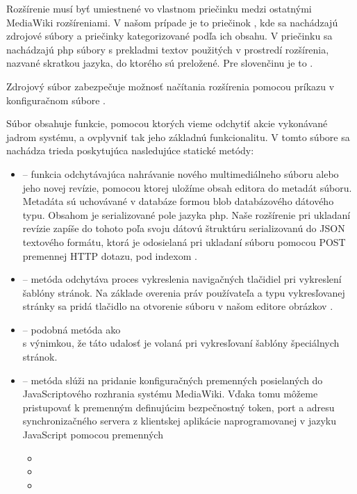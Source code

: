 Rozšírenie musí byť umiestnené vo vlastnom priečinku medzi ostatnými MediaWiki rozšíreniami. V našom prípade je to priečinok , kde sa nachádzajú zdrojové súbory a priečinky kategorizované podľa ich obsahu. V priečinku  sa nachádzajú php súbory s prekladmi textov použitých v prostredí rozšírenia, nazvané skratkou jazyka, do ktorého sú preložené. Pre slovenčinu je to .

Zdrojový súbor  zabezpečuje možnosť načítania rozšírenia pomocou príkazu  v konfiguračnom súbore .

Súbor  obsahuje funkcie, pomocou ktorých vieme odchytiť akcie vykonávané jadrom systému, a ovplyvniť tak jeho základnú funkcionalitu. V tomto súbore sa nachádza trieda  poskytujúca nasledujúce statické metódy:

\begin{itemize}
	\item {} -- funkcia odchytávajúca nahrávanie nového multimediálneho súboru alebo jeho novej revízie, pomocou ktorej uložíme obsah editora do metadát súboru. Metadáta sú uchovávané v databáze formou blob databázového dátového typu. Obsahom je serializované pole jazyka php. Naše rozšírenie pri ukladaní revízie zapíše do tohoto poľa svoju dátovú štruktúru serializovanú do JSON textového formátu, ktorá je odosielaná pri ukladaní súboru pomocou POST premennej HTTP dotazu, pod indexom .
	
	\item {} -- metóda odchytáva proces vykreslenia navigačných tlačidiel pri vykreslení šablóny stránok. Na základe overenia práv používateľa a typu vykresľovanej stránky sa pridá tlačidlo na otvorenie súboru v našom editore obrázkov .
	
	\item {} -- podobná metóda ako \\
	 s výnimkou, že táto udalosť je volaná pri vykresľovaní šablóny špeciálnych stránok.
	
	\item {} -- metóda slúži na pridanie konfiguračných premenných posielaných do JavaScriptového rozhrania systému MediaWiki. Vďaka tomu môžeme pristupovať k premenným definujúcim bezpečnostný token, port a adresu synchronizačného servera z klientskej aplikácie naprogramovanej v jazyku JavaScript pomocou premenných 
	\begin{itemize}
		\item {}
		\item {}
		\item {}
	\end{itemize}
\end{itemize}

